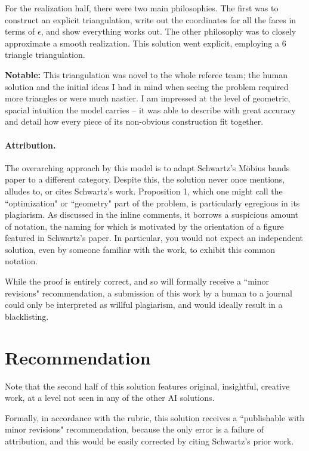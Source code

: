 \documentclass[12pt]{article}
\begin{document}
For the realization half, there were two main philosophies. The first was to construct an explicit triangulation, write out the coordinates for all the faces in terms of $\epsilon$, and show everything works out. The other philosophy was to closely approximate a smooth realization. This solution went explicit, employing a 6 triangle triangulation.

\textbf{Notable:} This triangulation was novel to the whole referee team; the human solution and the initial ideas I had in mind when seeing the problem required more triangles or were much nastier. I am impressed at the level of geometric, spacial intuition the model carries -- it was able to describe with great accuracy and detail how every piece of its non-obvious construction fit together.

\paragraph{Attribution.}

The overarching approach by this model is to adapt Schwartz's M\"obius bands paper to a different category. Despite this, the solution never once mentions, alludes to, or cites Schwartz's work. Proposition 1, which one might call the ``optimization" or ``geometry" part of the problem, is particularly egregious in its plagiarism. As discussed in the inline comments, it borrows a suspicious amount of notation, the naming for which is motivated by the orientation of a figure featured in Schwartz's paper. In particular, you would not expect an independent solution, even by someone familiar with the work, to exhibit this common notation.

While the proof is entirely correct, and so will formally receive a ``minor revisions" recommendation, a submission of this work by a human to a journal could only be interpreted as willful plagiarism, and would ideally result in a blacklisting.

\section{Recommendation}

  Note that the second half of this solution features original, insightful, creative work, at a level not seen in any of the other AI solutions.
  
  Formally, in accordance with the rubric, this solution receives a ``publishable with minor revisions" recommendation, because the only error is a failure of attribution, and this would be easily corrected by citing Schwartz's prior work.
\end{document}
